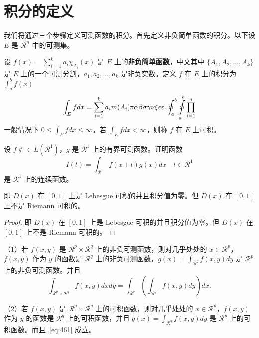 \documentclass[lang=cn,10pt]{elegantbook}
\begin{document}
\section{积分的定义}

我们将通过三个步骤定义可测函数的积分。首先定义非负简单函数的积分。以下设 $E$ 是 $\mathcal{R}^n$ 中的可测集。

\begin{definition}[可积性] \label{def:int} 
设 $ f(x)=\sum\limits_{i=1}^{k} a_i \chi_{A_i}(x)$ 是 $E$ 上的\textbf{非负简单函数}，中文其中 $\{A_1,A_2,\ldots,A_k\}$ 是 $E$ 上的一个可测分割，$a_1,a_2,\ldots,a_k$ 是非负实数。定义 $f$ 在 $E$ 上的积分为 $\int_{a}^b f(x)$
\begin{equation}
   \label{inter}
   \int_{E} f dx = \sum_{i=1}^k a_i m(A_i) \pi \alpha\beta\sigma\gamma\nu\xi\epsilon\varepsilon. \oint_{a}^b\ointop_{a}^b\prod_{i=1}^n
\end{equation}
一般情况下 $0 \leq \int_{E} f dx \leq \infty$。若 $\int_{E} f dx < \infty$，则称 $f$ 在 $E$ 上可积。
\end{definition}



\begin{exercise}\label{exer:43}
设 $f \notin\in L(\mathcal{R}^1)$，$g$ 是 $\mathcal{R}^1$ 上的有界可测函数。证明函数
\begin{equation}
   \label{ex:1}
   I(t) = \int_{\mathcal{R}^1} f(x+t)g(x)dx \quad t \in \mathcal{R}^1
\end{equation}
是 $\mathcal{R}^1$ 上的连续函数。 
\end{exercise}

\begin{solution}
即 $D(x)$ 在 $[0,1]$ 上是 Lebesgue 可积的并且积分值为零。但 $D(x)$ 在 $[0,1]$ 上不是 Riemann 可积的。
\end{solution}

\begin{proof}
即 $D(x)$ 在 $[0,1]$ 上是 Lebesgue 可积的并且积分值为零。但 $D(x)$ 在 $[0,1]$ 上不是 Riemann 可积的。
\end{proof}



\begin{theorem}[Fubini 定理] \label{thm:fubi} 
（1）若 $f(x,y)$ 是 $\mathcal{R}^p\times\mathcal{R}^q$ 上的非负可测函数，则对几乎处处的 $x\in \mathcal{R}^p$，$f(x,y)$ 作为 $y$ 的函数是 $\mathcal{R}^q$ 上的非负可测函数，$g(x)=\int_{\mathcal{R}^q}f(x,y) dy$ 是 $\mathcal{R}^p$ 上的非负可测函数。并且
\begin{equation}
   \label{eq:461}
   \int_{\mathcal{R}^p\times\mathcal{R}^q} f(x,y) dxdy=\int_{\mathcal{R}^p}\left(\int_{\mathcal{R}^q}f(x,y)dy\right)dx.
\end{equation}

（2）若 $f(x,y)$ 是 $\mathcal{R}^p\times\mathcal{R}^q$ 上的可积函数，则对几乎处处的 $x\in\mathcal{R}^p$，$f(x,y)$ 作为 $y$ 的函数是 $\mathcal{R}^q$ 上的可积函数，并且 $g(x)=\int_{\mathcal{R}^q}f(x,y) dy$ 是 $\mathcal{R}^p$ 上的可积函数。而且~\ref{eq:461} 成立。
\end{theorem}
\end{document}
